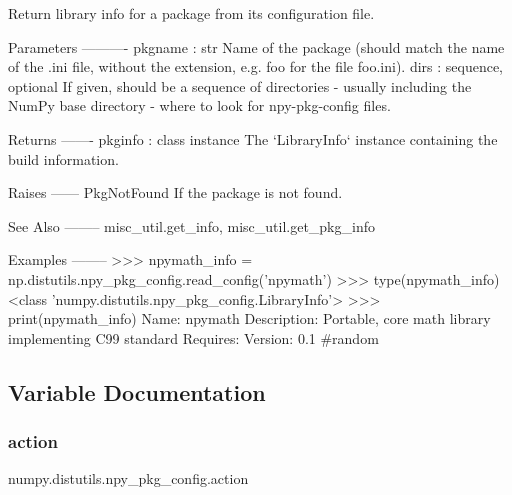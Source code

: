 \begin{DoxyVerb}Return library info for a package from its configuration file.

Parameters
----------
pkgname : str
    Name of the package (should match the name of the .ini file, without
    the extension, e.g. foo for the file foo.ini).
dirs : sequence, optional
    If given, should be a sequence of directories - usually including
    the NumPy base directory - where to look for npy-pkg-config files.

Returns
-------
pkginfo : class instance
    The `LibraryInfo` instance containing the build information.

Raises
------
PkgNotFound
    If the package is not found.

See Also
--------
misc_util.get_info, misc_util.get_pkg_info

Examples
--------
>>> npymath_info = np.distutils.npy_pkg_config.read_config('npymath')
>>> type(npymath_info)
<class 'numpy.distutils.npy_pkg_config.LibraryInfo'>
>>> print(npymath_info)
Name: npymath
Description: Portable, core math library implementing C99 standard
Requires:
Version: 0.1  #random\end{DoxyVerb}
 

\subsection{Variable Documentation}
\mbox{\label{namespacenumpy_1_1distutils_1_1npy__pkg__config_a7d9e47e796aa2aa9de5d597b95440f85}} 
\subsubsection{\texorpdfstring{action}{action}}
{\footnotesize\ttfamily numpy.\+distutils.\+npy\+\_\+pkg\+\_\+config.\+action}

\mbox{\label{namespacenumpy_1_1distutils_1_1npy__pkg__config_ad998caecc695aee68b6030a083cac42e}} 
